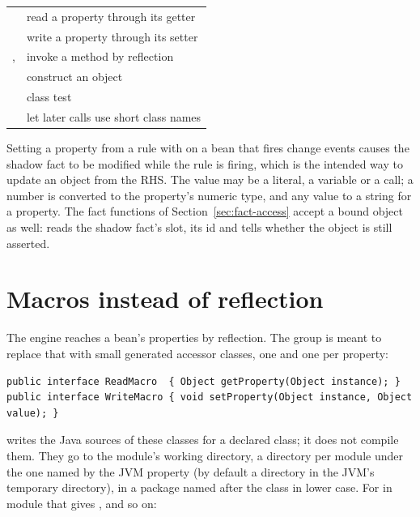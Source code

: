 \begin{center}
\begin{tabularx}{\textwidth}{lL}
\toprule
{} & read a property through its getter \\
 & write a property through its setter \\
,  & invoke a method by reflection \\
 & construct an object \\
 & class test \\
 & let later calls use short class names \\
\bottomrule
\end{tabularx}
\end{center}

Setting a property from a rule with  on a bean that fires
change events causes the shadow fact to be modified while the rule is
firing, which is the intended way to update an object from the RHS.
The value may be a literal, a variable or a call; a number is converted
to the property's numeric type, and any value to a string for a
 property.
The fact functions of Section~\ref{sec:fact-access} accept a bound
object as well:  reads the shadow fact's
slot,  its id and  tells
whether the object is still asserted.

\section{Macros instead of reflection}

The engine reaches a bean's properties by reflection. The  group is meant to replace that with small generated accessor
classes, one  and one  per property:

\begin{lstlisting}[style=java]
public interface ReadMacro  { Object getProperty(Object instance); }
public interface WriteMacro { void setProperty(Object instance, Object value); }
\end{lstlisting}

 writes the Java sources of these classes
for a declared class; it does not compile them. They go to the module's
working directory, a directory per module under the one named by the JVM
property  (by default a  directory in the
JVM's temporary directory), in a package named after the class in lower
case. For  in module  that
gives ,
 and so on:

